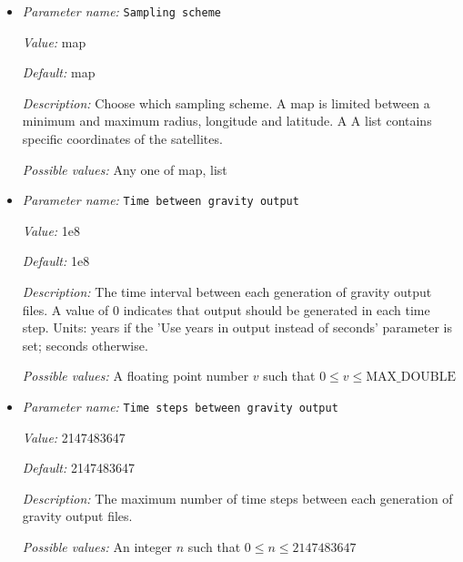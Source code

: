 \begin{itemize}
{\it Value:} 3300


{\it Default:} 3300


{\it Description:} Gravity anomalies may be computed using density anomalies relative to a reference density.


{\it Possible values:} A floating point number $v$ such that $0 \leq v \leq \text{MAX\_DOUBLE}$
\item {\it Parameter name:} {\tt Sampling scheme}
\label{parameters:Postprocess/Gravity calculation/Sampling scheme}
\label{parameters:Postprocess/Gravity_20calculation/Sampling_20scheme}


{\it Value:} map


{\it Default:} map


{\it Description:} Choose which sampling scheme. A map is limited between a minimum and maximum radius, longitude and latitude. A A list contains specific coordinates of the satellites.


{\it Possible values:} Any one of map, list
\item {\it Parameter name:} {\tt Time between gravity output}
\label{parameters:Postprocess/Gravity calculation/Time between gravity output}
\label{parameters:Postprocess/Gravity_20calculation/Time_20between_20gravity_20output}


{\it Value:} 1e8


{\it Default:} 1e8


{\it Description:} The time interval between each generation of gravity output files. A value of 0 indicates that output should be generated in each time step. Units: years if the 'Use years in output instead of seconds' parameter is set; seconds otherwise.


{\it Possible values:} A floating point number $v$ such that $0 \leq v \leq \text{MAX\_DOUBLE}$
\item {\it Parameter name:} {\tt Time steps between gravity output}
\label{parameters:Postprocess/Gravity calculation/Time steps between gravity output}
\label{parameters:Postprocess/Gravity_20calculation/Time_20steps_20between_20gravity_20output}


{\it Value:} 2147483647


{\it Default:} 2147483647


{\it Description:} The maximum number of time steps between each generation of gravity output files.


{\it Possible values:} An integer $n$ such that $0\leq n \leq 2147483647$
\end{itemize}

